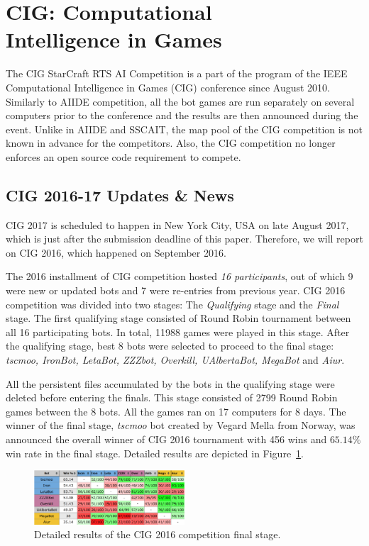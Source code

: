 \section{CIG: Computational\\ Intelligence in Games}\label{subsecCIG}

The CIG StarCraft RTS AI Competition is a part of the program of the IEEE Computational Intelligence in Games (CIG) conference since August 2010. Similarly to AIIDE competition, all the bot games are run separately on several computers prior to the conference and the results are then announced during the event. Unlike in AIIDE and SSCAIT, the map pool of the CIG competition is not known in advance for the competitors. Also, the CIG competition no longer enforces an open source code requirement to compete.

\subsection*{CIG 2016-17 Updates \& News}\label{subsecCIGnews}

CIG 2017 is scheduled to happen in New York City, USA on late August 2017, which is just after the submission deadline of this paper. Therefore, we will report on CIG 2016, which happened on September 2016. 


The 2016 installment of CIG competition hosted {\em 16 participants}, out of which 9 were new or updated bots and 7 were re-entries from previous year. CIG 2016 competition was divided into two stages: The {\em Qualifying} stage and the {\em Final} stage. The first qualifying stage consisted of Round Robin tournament between all 16 participating bots. In total, 11988 games were played in this stage. After the qualifying stage, best 8 bots were selected to proceed to the final stage: {\em tscmoo, IronBot, LetaBot, ZZZbot, Overkill, UAlbertaBot, MegaBot} and {\em Aiur}.

All the persistent files accumulated by the bots in the qualifying stage were deleted before entering the finals. This stage consisted of 2799 Round Robin games between the 8 bots. All the games ran on 17 computers for 8 days. The winner of the final stage, {\em tscmoo} bot created by Vegard Mella from Norway, was announced the overall winner of CIG 2016 tournament with 456 wins and $65.14\%$ win rate in the final stage. Detailed results are depicted in Figure~\ref{figCIGresults}. 

\begin{figure}[h]
  \centering
  \includegraphics[width=0.5\textwidth]{fig/cig-results.png}
  \caption{Detailed results of the CIG 2016 competition final stage.}
  \label{figCIGresults}
\end{figure}
